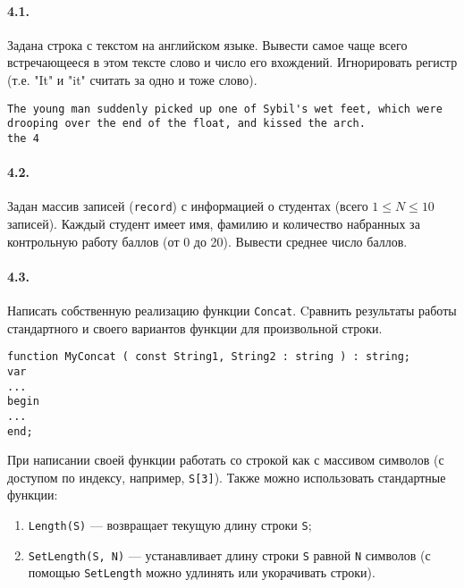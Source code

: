 \documentclass[12pt,a4paper]{report}
\begin{document}
\paragraph*{4.1.}
Задана строка с текстом на английском языке. Вывести самое чаще всего встречающееся в этом тексте слово и число его вхождений. Игнорировать регистр (т.е. "It" и "it" считать за одно и тоже слово).
\begin{verbatim}
The young man suddenly picked up one of Sybil's wet feet, which were drooping over the end of the float, and kissed the arch.
the 4
\end{verbatim}
\paragraph*{4.2.}
Задан массив записей (\texttt{record}) с информацией о студентах (всего $ 1 \le N \le 10 $ записей). Каждый студент имеет имя, фамилию и количество набранных за контрольную работу баллов (от 0 до 20).
Вывести среднее число баллов.
\paragraph*{4.3.}
Написать собственную реализацию функции \texttt{Concat}. Cравнить результаты работы стандартного и своего вариантов функции для произвольной строки.
\begin{verbatim}
function MyConcat ( const String1, String2 : string ) : string;
var
...
begin
...
end;
\end{verbatim}
При написании своей функции работать со строкой как с массивом символов (с доступом по индексу, например, \texttt{S[3]}). Также можно использовать стандартные функции:
\begin{enumerate}
\item \texttt{Length(S)} --- возвращает текущую длину строки \texttt{S};
\item \texttt{SetLength(S, N)} --- устанавливает длину строки \texttt{S} равной \texttt{N} символов (с помощью \texttt{SetLength} можно удлинять или укорачивать строки).
\end{enumerate}
\end{document}
